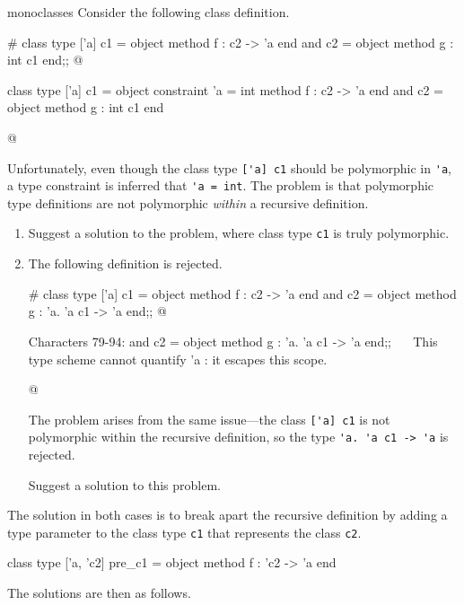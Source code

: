 \begin{exercise}{monoclasses}
Consider the following class definition.

\begin{ocaml}
# class type ['a] c1 = object method f : c2 -> 'a end
  and c2 = object method g : int c1 end;;
@
\begin{topoutput}
class type ['a] c1 = object constraint 'a = int method f : c2 -> 'a end
and c2 = object method g : int c1 end
\end{topoutput}
@
\end{ocaml}
%
Unfortunately, even though the class type \lstinline$['a] c1$ should
be polymorphic in \hbox{\lstinline$'a$}, a type constraint is inferred
that \hbox{\lstinline$'a = int$}.  The problem is that polymorphic
type definitions are not polymorphic \emph{within} a recursive
definition.

\begin{enumerate}
\item

Suggest a solution to the problem, where class type \lstinline$c1$ is
truly polymorphic.

\item

The following definition is rejected.

\begin{ocaml}
# class type ['a] c1 = object method f : c2 -> 'a end
  and c2 = object method g : 'a. 'a c1 -> 'a end;;
@
\begin{toperror}
Characters 79-94:
and c2 = object method g : 'a. 'a c1 -> 'a end;;
                           ^^^^^^^^^^^^^^^
This type scheme cannot quantify 'a :
it escapes this scope.
\end{toperror}
@
\end{ocaml}
%
The problem arises from the same issue---the class \lstinline$['a] c1$
is not polymorphic within the recursive definition, so the
type \lstinline$'a. 'a c1 -> 'a$ is rejected.

Suggest a solution to this problem.
\end{enumerate}

\begin{answer}\ifanswers
The solution in both cases is to break apart the recursive definition
by adding a type parameter to the class type \lstinline$c1$ that represents
the class \hbox{\lstinline$c2$}.

\begin{ocaml}
class type ['a, 'c2] pre_c1 = object method f : 'c2 -> 'a end
\end{ocaml}
%
The solutions are then as follows.


\end{answer}
\end{exercise}

